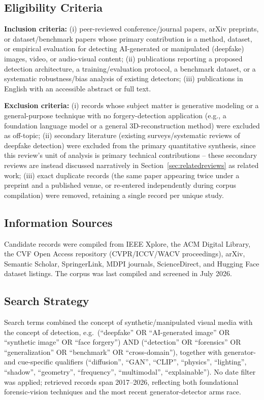 \documentclass[sn-mathphys-num,Numbered,pdflatex]{sn-jnl}
\begin{document}
\subsection{Eligibility Criteria}
\textbf{Inclusion criteria:} (i) peer-reviewed conference/journal papers, arXiv preprints, or dataset/benchmark papers whose primary contribution is a method, dataset, or empirical evaluation for detecting AI-generated or manipulated (deepfake) images, video, or audio-visual content; (ii) publications reporting a proposed detection architecture, a training/evaluation protocol, a benchmark dataset, or a systematic robustness/bias analysis of existing detectors; (iii) publications in English with an accessible abstract or full text.

\textbf{Exclusion criteria:} (i) records whose subject matter is generative modeling or a general-purpose technique with no forgery-detection application (e.g., a foundation language model or a general 3D-reconstruction method) were excluded as off-topic; (ii) secondary literature (existing surveys/systematic reviews of deepfake detection) were excluded from the primary quantitative synthesis, since this review's unit of analysis is primary technical contributions -- these secondary reviews are instead discussed narratively in Section~\ref{sec:relatedreviews} as related work; (iii) exact duplicate records (the same paper appearing twice under a preprint and a published venue, or re-entered independently during corpus compilation) were removed, retaining a single record per unique study.

\subsection{Information Sources}
Candidate records were compiled from IEEE Xplore, the ACM Digital Library, the CVF Open Access repository (CVPR/ICCV/WACV proceedings), arXiv, Semantic Scholar, SpringerLink, MDPI journals, ScienceDirect, and Hugging Face dataset listings. The corpus was last compiled and screened in July 2026.

\subsection{Search Strategy}
Search terms combined the concept of synthetic/manipulated visual media with the concept of detection, e.g.\ (``deepfake'' OR ``AI-generated image'' OR ``synthetic image'' OR ``face forgery'') AND (``detection'' OR ``forensics'' OR ``generalization'' OR ``benchmark'' OR ``cross-domain''), together with generator- and cue-specific qualifiers (``diffusion'', ``GAN'', ``CLIP'', ``physics'', ``lighting'', ``shadow'', ``geometry'', ``frequency'', ``multimodal'', ``explainable''). No date filter was applied; retrieved records span 2017--2026, reflecting both foundational forensic-vision techniques and the most recent generator-detector arms race.
\end{document}
